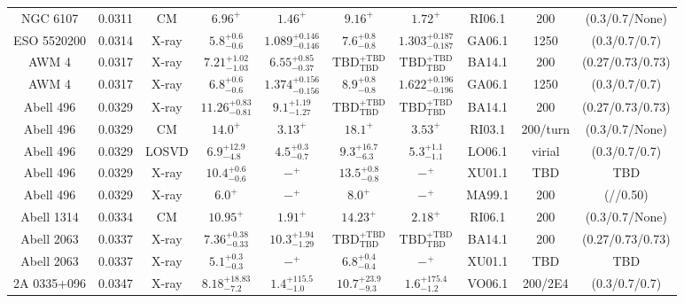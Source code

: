 \begin{table}
\begin{tabular}{cccccccccc}
NGC 6107 & 0.0311 & CM & ${6.96}^{+}_{}$ & ${1.46}^{+}_{}$ & ${9.16}^{+}_{}$ & ${1.72}^{+}_{}$ & RI06.1 & 200 & (0.3/0.7/None) \\
ESO 5520200 & 0.0314 & X-ray & ${5.8}^{+0.6}_{-0.6}$ & ${1.089}^{+0.146}_{-0.146}$ & ${7.6}^{+0.8}_{-0.8}$ & ${1.303}^{+0.187}_{-0.187}$ & GA06.1 & 1250 & (0.3/0.7/0.7) \\
AWM 4 & 0.0317 & X-ray & ${7.21}^{+1.02}_{-1.03}$ & ${6.55}^{+0.85}_{-0.37}$ & ${\mathrm{TBD}}^{+\mathrm{TBD}}_{\mathrm{TBD}}$ & ${\mathrm{TBD}}^{+\mathrm{TBD}}_{\mathrm{TBD}}$ & BA14.1 & 200 & (0.27/0.73/0.73) \\
AWM 4 & 0.0317 & X-ray & ${6.8}^{+0.6}_{-0.6}$ & ${1.374}^{+0.156}_{-0.156}$ & ${8.9}^{+0.8}_{-0.8}$ & ${1.622}^{+0.196}_{-0.196}$ & GA06.1 & 1250 & (0.3/0.7/0.7) \\
Abell 496 & 0.0329 & X-ray & ${11.26}^{+0.83}_{-0.81}$ & ${9.1}^{+1.19}_{-1.27}$ & ${\mathrm{TBD}}^{+\mathrm{TBD}}_{\mathrm{TBD}}$ & ${\mathrm{TBD}}^{+\mathrm{TBD}}_{\mathrm{TBD}}$ & BA14.1 & 200 & (0.27/0.73/0.73) \\
Abell 496 & 0.0329 & CM & ${14.0}^{+}_{}$ & ${3.13}^{+}_{}$ & ${18.1}^{+}_{}$ & ${3.53}^{+}_{}$ & RI03.1 & 200/turn & (0.3/0.7/None) \\
Abell 496 & 0.0329 & LOSVD & ${6.9}^{+12.9}_{-4.8}$ & ${4.5}^{+0.3}_{-0.7}$ & ${9.3}^{+16.7}_{-6.3}$ & ${5.3}^{+1.1}_{-1.1}$ & LO06.1 & virial & (0.3/0.7/0.7) \\
Abell 496 & 0.0329 & X-ray & ${10.4}^{+0.6}_{-0.6}$ & ${-}^{+}_{}$ & ${13.5}^{+0.8}_{-0.8}$ & ${-}^{+}_{}$ & XU01.1 & TBD & TBD \\
Abell 496 & 0.0329 & X-ray & ${6.0}^{+}_{}$ & ${-}^{+}_{}$ & ${8.0}^{+}_{}$ & ${-}^{+}_{}$ & MA99.1 & 200 & (//0.50) \\
Abell 1314 & 0.0334 & CM & ${10.95}^{+}_{}$ & ${1.91}^{+}_{}$ & ${14.23}^{+}_{}$ & ${2.18}^{+}_{}$ & RI06.1 & 200 & (0.3/0.7/None) \\
Abell 2063 & 0.0337 & X-ray & ${7.36}^{+0.38}_{-0.33}$ & ${10.3}^{+1.94}_{-1.29}$ & ${\mathrm{TBD}}^{+\mathrm{TBD}}_{\mathrm{TBD}}$ & ${\mathrm{TBD}}^{+\mathrm{TBD}}_{\mathrm{TBD}}$ & BA14.1 & 200 & (0.27/0.73/0.73) \\
Abell 2063 & 0.0337 & X-ray & ${5.1}^{+0.3}_{-0.3}$ & ${-}^{+}_{}$ & ${6.8}^{+0.4}_{-0.4}$ & ${-}^{+}_{}$ & XU01.1 & TBD & TBD \\
2A 0335+096 & 0.0347 & X-ray & ${8.18}^{+18.83}_{-7.2}$ & ${1.4}^{+115.5}_{-1.0}$ & ${10.7}^{+23.9}_{-9.3}$ & ${1.6}^{+175.4}_{-1.2}$ & VO06.1 & 200/2E4 & (0.3/0.7/0.7) \\

\end{tabular}
\end{table}
